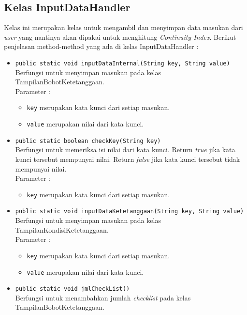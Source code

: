 \subsection{Kelas InputDataHandler}
Kelas ini merupakan kelas untuk mengambil dan menyimpan data masukan dari \textit{user} yang nantinya akan dipakai untuk menghitung \textit{Continuity Index}.
Berikut penjelasan method-method yang ada di kelas InputDataHandler :
	\begin{itemize}
		\item \texttt{public static void inputDataInternal(String key, String value)}\\
		Berfungsi untuk menyimpan masukan pada kelas TampilanBobotKetetanggaan.\\
		Parameter :
		\begin{itemize}
			\item \texttt{key} merupakan kata kunci dari setiap masukan.
			\item \texttt{value} merupakan nilai dari kata kunci.
		\end{itemize}
		
		\item \texttt{public static boolean checkKey(String key)}\\
		Berfungsi untuk memeriksa isi nilai dari kata kunci. Return \textit{true} jika kata kunci tersebut mempunyai nilai. Return \textit{false} jika kata kunci tersebut tidak mempunyai nilai.\\
		Parameter :
		\begin{itemize}
			\item \texttt{key} merupakan kata kunci dari setiap masukan.
		\end{itemize}
		
		\item \texttt{public static void inputDataKetetanggaan(String key, String value)}\\
		Berfungsi untuk menyimpan masukan pada kelas TampilanKondisiKetetanggaan.\\
		Parameter :
		\begin{itemize}
			\item \texttt{key} merupakan kata kunci dari setiap masukan.
			\item \texttt{value} merupakan nilai dari kata kunci.
		\end{itemize}
		
		\item \texttt{public static void jmlCheckList()}\\
		Berfungsi untuk menambahkan jumlah \textit{checklist} pada kelas TampilanBobotKetetanggaan.
		

\end{itemize}
